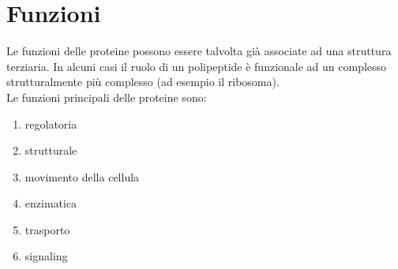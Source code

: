      
    
\section{Funzioni}
    Le funzioni delle proteine possono essere talvolta già associate ad una struttura terziaria. In alcuni casi il ruolo di un polipeptide è funzionale ad un complesso strutturalmente più complesso (ad esempio il ribosoma). \\
    Le funzioni principali delle proteine sono:
    \begin{enumerate}
        \item regolatoria
        \item strutturale
        \item movimento della cellula
        \item enzimatica
        \item trasporto
        \item signaling
    \end{enumerate}
    
    
    \pagebreak